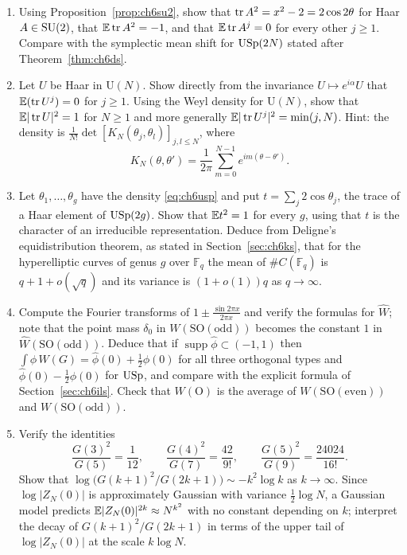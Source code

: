 \begin{enumerate}
\item Using Proposition~\ref{prop:ch6su2}, show that $\operatorname{tr} A^2=x^2-2=2\cos2\theta$ for Haar $A\in\mathrm{SU}(2)$, that $\mathbb{E}\operatorname{tr} A^2=-1$, and that $\mathbb{E}\operatorname{tr} A^j=0$ for every other $j\ge1$. Compare with the symplectic mean shift for $\mathrm{USp}(2N)$ stated after Theorem~\ref{thm:ch6ds}.
\item Let $U$ be Haar in $\mathrm{U}(N)$. Show directly from the invariance $U\mapsto e^{i\alpha}U$ that $\mathbb{E}(\operatorname{tr} U^j)=0$ for $j\ge1$. Using the Weyl density for $\mathrm{U}(N)$, show that $\mathbb{E}|\operatorname{tr} U|^2=1$ for $N\ge1$ and more generally $\mathbb{E}|\operatorname{tr} U^j|^2=\min(j,N)$. Hint: the density is $\frac1{N!}\det[K_N(\theta_j,\theta_l)]_{j,l\le N}$, where
\[
K_N(\theta,\theta')=\frac1{2\pi}\sum_{m=0}^{N-1}e^{im(\theta-\theta')}.
\]
\item Let $\theta_1,\dots,\theta_g$ have the density \eqref{eq:ch6usp} and put $t=\sum_j2\cos\theta_j$, the trace of a Haar element of $\mathrm{USp}(2g)$. Show that $\mathbb{E} t^2=1$ for every $g$, using that $t$ is the character of an irreducible representation. Deduce from Deligne's equidistribution theorem, as stated in Section~\ref{sec:ch6ks}, that for the hyperelliptic curves of genus $g$ over $\mathbb{F}_q$ the mean of $\#C(\mathbb{F}_q)$ is $q+1+o(\sqrt q)$ and its variance is $(1+o(1))q$ as $q\to\infty$.
\item Compute the Fourier transforms of $1\pm\frac{\sin2\pi x}{2\pi x}$ and verify the formulas for $\hat W$; note that the point mass $\delta_0$ in $W(\mathrm{SO(odd)})$ becomes the constant $1$ in $\hat W(\mathrm{SO(odd)})$. Deduce that if $\operatorname{supp}\hat\phi\subset(-1,1)$ then $\int\phi\,W(G)=\hat\phi(0)+\frac12\phi(0)$ for all three orthogonal types and $\hat\phi(0)-\frac12\phi(0)$ for $\mathrm{USp}$, and compare with the explicit formula of Section~\ref{sec:ch6ils}. Check that $W(\mathrm{O})$ is the average of $W(\mathrm{SO(even)})$ and $W(\mathrm{SO(odd)})$.
\item Verify the identities
\[
\frac{G(3)^2}{G(5)}=\frac1{12},\qquad\frac{G(4)^2}{G(7)}=\frac{42}{9!},\qquad\frac{G(5)^2}{G(9)}=\frac{24024}{16!}.
\]
Show that $\log\bigl(G(k+1)^2/G(2k+1)\bigr)\sim-k^2\log k$ as $k\to\infty$. Since $\log|Z_N(0)|$ is approximately Gaussian with variance $\frac12\log N$, a Gaussian model predicts $\mathbb{E}|Z_N(0)|^{2k}\approx N^{k^2}$ with no constant depending on $k$; interpret the decay of $G(k+1)^2/G(2k+1)$ in terms of the upper tail of $\log|Z_N(0)|$ at the scale $k\log N$.
\end{enumerate}

